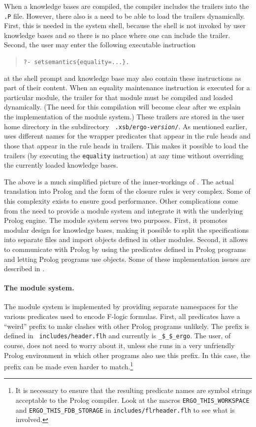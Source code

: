 \documentclass[11pt]{article}
\newcommand{\ERGO}{\mbox{\smaller{\ensuremath{\cal{E}}\smaller{{\sc{RGO}}}}}\xspace}
\newcommand{\FLSYSTEM}{\ERGO}
\newcommand{\fl}{\mbox{F-logic}\xspace}
\begin{document}
When a \FLSYSTEM knowledge bases are compiled, the compiler includes the trailers into
the {\tt .P} file. However, there also is a need to be able to load the
trailers dynamically. First, this is needed in the system shell, because
the shell is not invoked by user knowledge bases and so there is
no place where one can include the trailer. Second, the user may enter the
following executable instruction 
\begin{quote}
   {\tt ?- setsemantics\{equality=...\}. }
\end{quote}
at the shell prompt and knowledge base may also contain these instructions as
part of their content.  When an equality maintenance instruction is executed
for a particular module, the trailer for that module must be compiled and
loaded dynamically.  (The need for this compilation will become clear after
we explain the implementation of the module system.)  These trailers are
stored in the user home directory in the subdirectory {\tt
  .xsb/ergo-\emph{version}/}.
As mentioned earlier, \FLSYSTEM uses different names for the wrapper predicates
that appear in the rule heads and those that appear in the
rule heads in trailers. This makes it possible to load the trailers (by
executing the {\tt equality} instruction) at any time without overriding
the currently loaded knowledge bases.

The above is a much simplified picture of the inner-workings of \FLSYSTEM. The
actual translation into Prolog and the form of the closure rules is very
complex.  Some of this complexity exists to ensure good performance.  Other
complications come from the need to provide a module system and integrate
it with the underlying Prolog engine.  The module system serves two
purposes.  First, it promotes modular design for \FLSYSTEM knowledge bases, making it
possible to split the specifications into separate files and import objects defined
in other modules. Second, it allows \FLSYSTEM to communicate with
Prolog by using the predicates defined in Prolog programs and letting
Prolog programs use \FLSYSTEM objects.  Some of these implementation issues
are described in \cite{guiz-flora-00}.

\paragraph{The module system.} The module system is implemented by
providing separate namespaces for the various predicates used to encode \fl
formulas. First, all predicates have a ``weird'' prefix to make clashes with
other Prolog programs unlikely. The prefix is defined in {\tt
  includes/header.flh} and currently is {\tt \_\$\_\$\_ergo}. The user, of
course, does not need to worry about it, unless she runs \FLSYSTEM in
a very unfriendly Prolog environment in which other programs also use this
prefix. In this case, the prefix can be made
even harder to match.\footnote{
  It is necessary to ensure that the resulting predicate names are symbol
  strings acceptable to the Prolog compiler. Look at the macros
  {\tt ERGO\_THIS\_WORKSPACE} and {\tt ERGO\_THIS\_FDB\_STORAGE} in
  {\tt includes/flrheader.flh} to see what is involved.
  }
\end{document}
